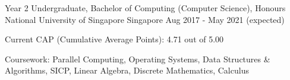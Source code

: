 

\begin{cventries}

  \cventry
    {Year 2 Undergraduate, Bachelor of Computing (Computer Science), Honours} %
    {National University of Singapore} %
    {Singapore} %
    {Aug 2017 - May 2021 (expected)} %
    {
      \begin{cvitems} %
        \item {Current CAP (Cumulative Average Points): 4.71 out of 5.00}
        \item {Coursework: Parallel Computing, Operating Systems, Data Structures \& Algorithms, SICP, Linear Algebra, Discrete Mathematics, Calculus}
      \end{cvitems}
    }
    
    


\end{cventries}
